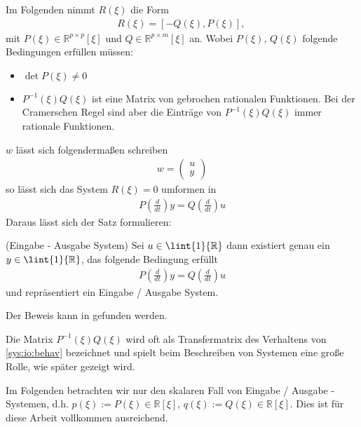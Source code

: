 Im Folgenden nimmt $R(\xi)$ die Form 
\begin{align}
	R(\xi) = [-Q(\xi), P(\xi)] \text{, } \label{sys:io1}
\end{align}
mit $P(\xi) \in \mathbb{R}^{p \times p}[\xi]$ und $Q \in \mathbb{R}^{p \times m}[\xi]$ an.
Wobei $P(\xi)$, $Q(\xi)$ folgende Bedingungen erfüllen müssen:
\begin{itemize}
\item $\det P(\xi) \neq 0$
\item $P^{-1} (\xi) Q(\xi)$ ist eine Matrix von gebrochen rationalen Funktionen. Bei der Cramerschen Regel sind aber die Einträge von $P^{-1}(\xi) Q(\xi)$ immer rationale Funktionen. 
\end{itemize}
$w$ lässt sich folgendermaßen schreiben 
\begin{align}
	w = \left(\begin{array}{c}
	u \\ 
	y
	\end{array} \right)
\end{align}
so lässt sich das System $R(\xi) = 0$ umformen in
\begin{align}
	P(\frac{d}{dt}) y = Q(\frac{d}{dt}) u
\end{align}
Daraus lässt sich der Satz formulieren:
\begin{satz}(Eingabe - Ausgabe System)\label{sys:io}
Sei $u \in \lint{1}{\mathbb{R}}$ dann existiert genau ein $y \in \lint{1}{\mathbb{R}}$, das folgende Bedingung erfüllt
\begin{align}
	P(\frac{d}{dt}) y = Q(\frac{d}{dt}) u \label{sys:io:behav}
\end{align}
und repräsentiert ein Eingabe / Ausgabe System.
\end{satz}
Der Beweis kann in \cite{Polderman1997} gefunden werden.
\begin{bem}
Die Matrix $P^{-1}(\xi) Q(\xi)$ wird oft als Transfermatrix des Verhaltens von \ref{sys:io:behav} bezeichnet und spielt beim Beschreiben von Systemen eine große Rolle, wie später gezeigt wird.
\end{bem} 
\begin{bem}

Im Folgenden betrachten wir nur den skalaren Fall von Eingabe / Ausgabe - Systemen, d.h. $p(\xi) := P(\xi) \in \mathbb{R}[\xi]$,  $q(\xi) := Q(\xi) \in \mathbb{R}[\xi]$. Dies ist für diese Arbeit vollkommen ausreichend.
\end{bem}
